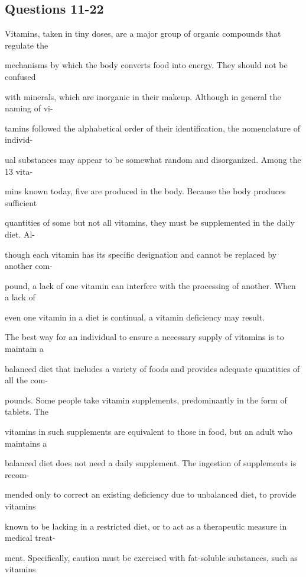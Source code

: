 \documentclass[12pt]{article}
\begin{document}
\subsection*{Questions 11-22}
\begingroup
\small
\sloppy
\setlength{\parskip}{0pt}
\setlength{\parindent}{0pt}
Vitamins, taken in tiny doses, are a major group of organic compounds that regulate the\par
mechanisms by which the body converts food into energy. They should not be confused\par
 with minerals, which are inorganic in their makeup. Although in general the naming of vi-\par
tamins followed the alphabetical order of their identification, the nomenclature of individ-\par
ual substances may appear to be somewhat random and disorganized. Among the 13 vita-\par
mins known today, five are produced in the body. Because the body produces sufficient\par
quantities of some but not all vitamins, they must be supplemented in the daily diet. Al-\par
though each vitamin has its specific designation and cannot be replaced by another com-\par
pound, a lack of one vitamin can interfere with the processing of another. When a lack of\par
even one vitamin in a diet is continual, a vitamin deficiency may result.\par
The best way for an individual to ensure a necessary supply of vitamins is to maintain a\par
balanced diet that includes a variety of foods and provides adequate quantities of all the com-\par
pounds. Some people take vitamin supplements, predominantly in the form of tablets. The\par
vitamins in such supplements are equivalent to those in food, but an adult who maintains a\par
balanced diet does not need a daily supplement. The ingestion of supplements is recom-\par
mended only to correct an existing deficiency due to unbalanced diet, to provide vitamins\par
known to be lacking in a restricted diet, or to act as a therapeutic measure in medical treat-\par
ment. Specifically, caution must be exercised with fat-soluble substances, such as vitamins\par
\end{document}
